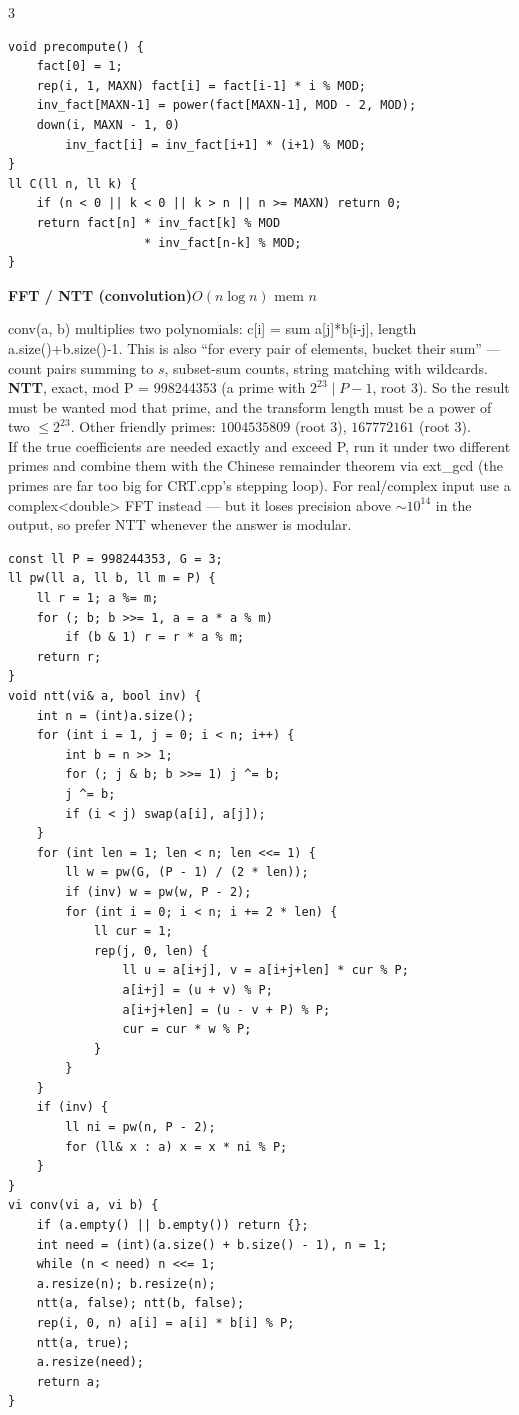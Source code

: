 \documentclass[9pt,a4paper]{extarticle}
\newcommand{\entry}[3]{%
  \addcontentsline{toc}{subsection}{#1}%
  \vspace{0.8ex}%
  \noindent\colorbox{hdbg}{\parbox{\dimexpr\columnwidth-2\fboxsep}{%
    \strut\textbf{#1}\hfill{\footnotesize\textsf{#2}}}}\par
  \vspace{0.4ex}%
  {\footnotesize #3\par}%
}
\newcommand{\code}[1]{{\ttfamily\small #1}}
\begin{document}
\begin{multicols*}{3}
\begin{lstlisting}
void precompute() {
    fact[0] = 1;
    rep(i, 1, MAXN) fact[i] = fact[i-1] * i % MOD;
    inv_fact[MAXN-1] = power(fact[MAXN-1], MOD - 2, MOD);
    down(i, MAXN - 1, 0)
        inv_fact[i] = inv_fact[i+1] * (i+1) % MOD;
}
ll C(ll n, ll k) {
    if (n < 0 || k < 0 || k > n || n >= MAXN) return 0;
    return fact[n] * inv_fact[k] % MOD
                   * inv_fact[n-k] % MOD;
}
\end{lstlisting}

\entry{FFT / NTT (convolution)}{$O(n \log n)$ \quad mem $n$}{%
\code{conv(a, b)} multiplies two polynomials: \code{c[i] = sum a[j]*b[i-j]}, length
\code{a.size()+b.size()-1}. This is also ``for every pair of elements, bucket their
sum'' --- count pairs summing to $s$, subset-sum counts, string matching with
wildcards.\\[0.3ex]
\textbf{NTT}, exact, mod \code{P = 998244353} (a prime with $2^{23} \mid P-1$, root 3).
So the result must be wanted mod that prime, and the transform length must be a power
of two $\le 2^{23}$. Other friendly primes: $1004535809$ (root 3),
$167772161$ (root 3).\\[0.3ex]
If the true coefficients are needed exactly and exceed \code{P}, run it under two
different primes and combine them with the Chinese remainder theorem via
\code{ext\_gcd} (the primes are far too big for \code{CRT.cpp}'s stepping loop). For real/complex input use a
\code{complex<double>} FFT instead --- but it loses precision above $\sim10^{14}$ in the
output, so prefer NTT whenever the answer is modular.}

\begin{lstlisting}
const ll P = 998244353, G = 3;
ll pw(ll a, ll b, ll m = P) {
    ll r = 1; a %= m;
    for (; b; b >>= 1, a = a * a % m)
        if (b & 1) r = r * a % m;
    return r;
}
void ntt(vi& a, bool inv) {
    int n = (int)a.size();
    for (int i = 1, j = 0; i < n; i++) {
        int b = n >> 1;
        for (; j & b; b >>= 1) j ^= b;
        j ^= b;
        if (i < j) swap(a[i], a[j]);
    }
    for (int len = 1; len < n; len <<= 1) {
        ll w = pw(G, (P - 1) / (2 * len));
        if (inv) w = pw(w, P - 2);
        for (int i = 0; i < n; i += 2 * len) {
            ll cur = 1;
            rep(j, 0, len) {
                ll u = a[i+j], v = a[i+j+len] * cur % P;
                a[i+j] = (u + v) % P;
                a[i+j+len] = (u - v + P) % P;
                cur = cur * w % P;
            }
        }
    }
    if (inv) {
        ll ni = pw(n, P - 2);
        for (ll& x : a) x = x * ni % P;
    }
}
vi conv(vi a, vi b) {
    if (a.empty() || b.empty()) return {};
    int need = (int)(a.size() + b.size() - 1), n = 1;
    while (n < need) n <<= 1;
    a.resize(n); b.resize(n);
    ntt(a, false); ntt(b, false);
    rep(i, 0, n) a[i] = a[i] * b[i] % P;
    ntt(a, true);
    a.resize(need);
    return a;
}
\end{lstlisting}


\end{multicols*}
\end{document}
